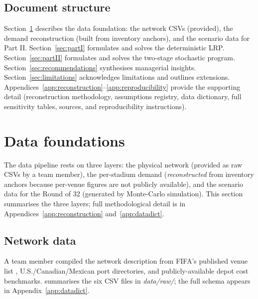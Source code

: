 \documentclass[11pt,a4paper]{article}
\numberwithin{equation}{section}
\newcommand{\filename}[1]{\textit{\small #1}}
\begin{document}
\subsection{Document structure}

Section~\ref{sec:data} describes the data foundation: the network CSVs (provided), the demand reconstruction (built from inventory anchors), and the scenario data for Part II. Section~\ref{sec:partI} formulates and solves the deterministic LRP. Section~\ref{sec:partII} formulates and solves the two-stage stochastic program. Section~\ref{sec:recommendations} synthesises managerial insights. Section~\ref{sec:limitations} acknowledges limitations and outlines extensions. Appendices~\ref{app:reconstruction}--\ref{app:reproducibility} provide the supporting detail (reconstruction methodology, assumptions registry, data dictionary, full sensitivity tables, sources, and reproducibility instructions).

\section{Data foundations}\label{sec:data}

The data pipeline rests on three layers: the physical network (provided as raw CSVs by a team member), the per-stadium demand (\emph{reconstructed} from inventory anchors because per-venue figures are not publicly available), and the scenario data for the Round of 32 (generated by Monte-Carlo simulation). This section summarises the three layers; full methodological detail is in Appendices~\ref{app:reconstruction} and~\ref{app:datadict}.

\subsection{Network data}\label{sec:data:network}

A team member compiled the network description from FIFA's published venue list \cite{fifa2026official}, U.S./Canadian/Mexican port directories, and publicly-available depot cost benchmarks.  summarises the six CSV files in \filename{data/raw/}; the full schema appears in Appendix~\ref{app:datadict}.
\end{document}
